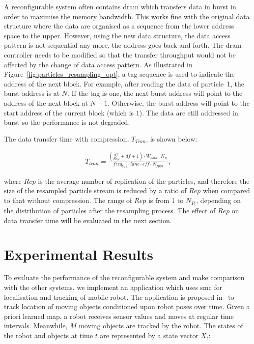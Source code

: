 A reconfigurable system often contains \gls{dram} which transfers data in burst in order to maximise the memory bandwidth.
This works fine with the original data structure where the data are organised as a sequence from the lower address space to the upper.
However, using the new data structure, the data access pattern is not sequential any more, the address goes back and forth.
The \gls{dram} controller needs to be modified so that the transfer throughput would not be affected by the change of data access pattern.
As illustrated in Figure~\ref{fig:particles_resampling_opt}, a tag sequence is used to indicate the address of the next block.
For example, after reading the data of particle~1, the burst address is at $N$.
If the tag is one, the next burst address will point to the address of the next block at $N+1$.
Otherwise, the burst address will point to the start address of the current block (which is $1$).
The data are still addressed in burst so the performance is not degraded.

The data transfer time with compression, $T_{Tran}$, is shown below:

\begin{equation}
\begin{aligned}
T_{tran} = \frac{(\frac{df}{Rep} + df + 1) \cdot W_{data} \cdot {N_{P_t}}}{freq_{bus} \cdot lane \cdot eff \cdot N_{fpga}} \mbox{,}
\end{aligned}
\label{eqt:data_opt}
\end{equation}

where $Rep$ is the average number of replication of the particles,
and therefore the size of the resampled particle stream is reduced by a ratio of $Rep$ when compared to that without compression.
The range of $Rep$ is from 1 to $N_{P_t}$, depending on the distribution of particles after the resampling process.
The effect of $Rep$ on data transfer time will be evaluated in the next section.

\section{Experimental Results}
\label{sec:reconfig_results}

To evaluate the performance of the reconfigurable system and make comparison with the other systems, 
we implement an application which uses \gls{smc} for localisation and tracking of mobile robot.
The application is proposed in~\cite{montemerlo02} to track location of moving objects conditioned upon robot poses over time.
Given a priori learned map, a robot receives sensor values and moves at regular time intervals. 
Meanwhile, $M$ moving objects are tracked by the robot.
The states of the robot and objects at time $t$ are represented by a state vector $X_t$:
 
